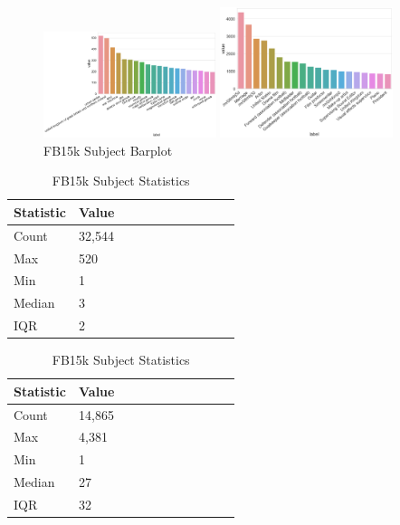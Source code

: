 
\begin{figure}[H]
	\parbox{.5\linewidth}{
   		\caption{WN18 Subject Barplot}
   		\centering
    		\includegraphics[width=0.45\textwidth, height=0.2\textheight]{WN18_Subject_Counts}
		}
	\hfill
	\parbox{.5\linewidth}{
		\caption{FB15k Subject Barplot}
   		\centering
		\includegraphics[width=0.45\textwidth, height=0.2\textheight]{FB15k_Subject_Counts}
		}
\end{figure}


\begin{table}[H]
	\parbox{.5\linewidth}{
		\caption{WN18 Subject Statistics}
		\centering
		\begin{tabular}{lllllllllll}
  			\textbf{Statistic} & \textbf{Value}  \\
  			\hline
			Count & 32,544 \\
			Max & 520 \\
			Min & 1 \\
  			Median & 3 \\
  			IQR & 2 \\
		\end{tabular}
		}
	\hfill
	\parbox{.5\linewidth}{
		\caption{FB15k Subject Statistics}
		\centering
		\begin{tabular}{lllllllllll}
  			\textbf{Statistic} & \textbf{Value}  \\
  			\hline
			Count &14,865 \\
			Max & 4,381 \\
			Min & 1 \\
  			Median & 27 \\
  			IQR & 32 \\
		\end{tabular}
		}
\end{table}

